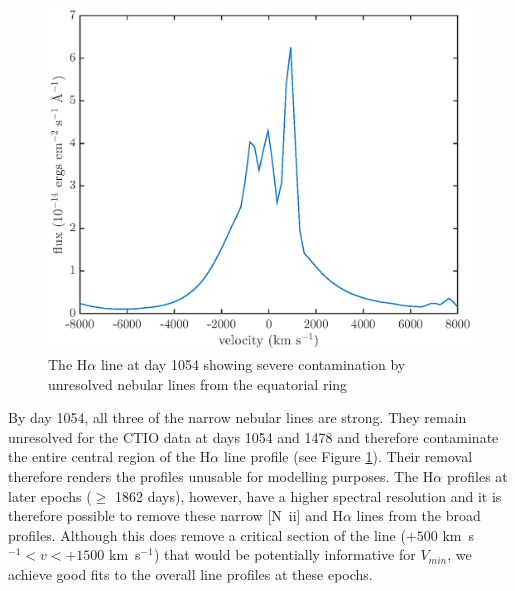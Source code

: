 \documentclass[useAMS,usenatbib,usegraphicx]{mnras}
\begin{document}
 \begin{figure}
\begin{center}
\includegraphics[trim=38 7 35 20,clip=true,scale=0.49]{d1054Ha}
\caption{The H$\alpha$ line at day 1054 showing severe contamination by unresolved nebular lines from the equatorial ring}
\label{d1054}
\end{center}
\end{figure}

 
 By day 1054, all three of the narrow nebular lines are strong.  They remain unresolved for the CTIO data at days 1054 and 1478 and therefore contaminate the entire central region of the H$\alpha$ line profile (see Figure \ref{d1054}).  Their removal therefore renders the profiles unusable for modelling purposes.  The H$\alpha$ profiles at later epochs ($\ge$ 1862 days), however, have a higher spectral resolution and it is therefore possible to remove these narrow [N~{\sc ii}] and H$\alpha$ lines from the broad profiles. Although this does remove a 
critical section of the line ($+500$ km~s$^{-1}<v<+1500$ km~s$^{-1}$) that 
would be potentially informative for $V_{min}$, we achieve good fits 
to the overall line profiles at these epochs.


\end{document}
